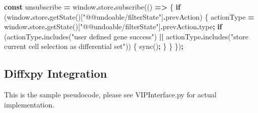 \documentclass[
]{article}
\newenvironment{Shaded}{\begin{snugshade}}{\end{snugshade}}
\newcommand{\AttributeTok}[1]{\textcolor[rgb]{0.77,0.63,0.00}{#1}}
\newcommand{\BuiltInTok}[1]{#1}
\newcommand{\ControlFlowTok}[1]{\textcolor[rgb]{0.13,0.29,0.53}{\textbf{#1}}}
\newcommand{\FunctionTok}[1]{\textcolor[rgb]{0.00,0.00,0.00}{#1}}
\newcommand{\KeywordTok}[1]{\textcolor[rgb]{0.13,0.29,0.53}{\textbf{#1}}}
\newcommand{\NormalTok}[1]{#1}
\newcommand{\OperatorTok}[1]{\textcolor[rgb]{0.81,0.36,0.00}{\textbf{#1}}}
\newcommand{\StringTok}[1]{\textcolor[rgb]{0.31,0.60,0.02}{#1}}
\begin{document}
\begin{Shaded}
\begin{Highlighting}[]
\KeywordTok{const}\NormalTok{ unsubscribe }\OperatorTok{=} \BuiltInTok{window}\OperatorTok{.}\AttributeTok{store}\OperatorTok{.}\FunctionTok{subscribe}\NormalTok{(() }\KeywordTok{=\textgreater{}}\NormalTok{ \{}
  \ControlFlowTok{if}\NormalTok{ (}\BuiltInTok{window}\OperatorTok{.}\AttributeTok{store}\OperatorTok{.}\FunctionTok{getState}\NormalTok{()[}\StringTok{"@@undoable/filterState"}\NormalTok{]}\OperatorTok{.}\AttributeTok{prevAction}\NormalTok{) \{}
\NormalTok{    actionType }\OperatorTok{=} \BuiltInTok{window}\OperatorTok{.}\AttributeTok{store}\OperatorTok{.}\FunctionTok{getState}\NormalTok{()[}\StringTok{"@@undoable/filterState"}\NormalTok{]}\OperatorTok{.}\AttributeTok{prevAction}\OperatorTok{.}\AttributeTok{type}\OperatorTok{;}
    \ControlFlowTok{if}\NormalTok{ (actionType}\OperatorTok{.}\FunctionTok{includes}\NormalTok{(}\StringTok{"user defined gene success"}\NormalTok{) }\OperatorTok{||}
\NormalTok{    actionType}\OperatorTok{.}\FunctionTok{includes}\NormalTok{(}\StringTok{"store current cell selection as differential set"}\NormalTok{)) \{}
      \FunctionTok{sync}\NormalTok{()}\OperatorTok{;}
\NormalTok{      \}}
\NormalTok{  \}}
\NormalTok{\})}\OperatorTok{;}
\end{Highlighting}
\end{Shaded}

\hypertarget{diffxpy-integration}{%
\subsection*{Diffxpy Integration}\label{diffxpy-integration}}

This is the sample pseudocode, please see VIPInterface.py for actual implementation.
\end{document}

